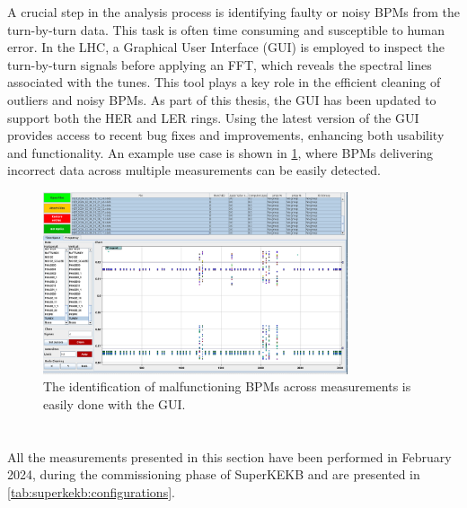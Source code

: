 A crucial step in the analysis process is identifying faulty or noisy BPMs from the turn-by-turn
data. This task is often time consuming and susceptible to human error. In the LHC, a Graphical User
Interface (GUI) is employed to inspect the turn-by-turn signals before applying an FFT, which
reveals the spectral lines associated with the tunes. This tool plays a key role in the efficient
cleaning of outliers and noisy BPMs. As part of this thesis, the GUI has been updated to support
both the HER and LER rings. Using the latest version of the GUI provides access to recent bug fixes
and improvements, enhancing both usability and functionality. An example use case is shown in
\cref{fig:kek:gui_bad_bpms}, where BPMs delivering incorrect data across multiple measurements can
be easily detected.

\begin{figure}[!htb]
    \centering
    \includegraphics[width=0.8\textwidth]{./images/kek/GUIbadbpm.png}
    \caption{The identification of malfunctioning BPMs across measurements is easily done with the GUI.}
    \label{fig:kek:gui_bad_bpms}
\end{figure}



\FloatBarrier
\section{}

All the measurements presented in this section have been performed in February 2024, during the
commissioning phase of SuperKEKB and are presented in \cref{tab:superkekb:configurations}.

\subsection{}

